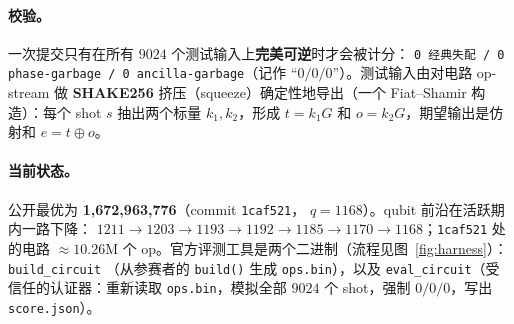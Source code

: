 \documentclass[11pt]{ctexart}
\let\c\lstinline
\begin{document}
\paragraph{校验。}一次提交只有在所有 $9024$ 个测试输入上\textbf{完美可逆}时才会被计分：
\texttt{0 经典失配 / 0 phase-garbage / 0 ancilla-garbage}（记作 ``$0/0/0$''）。测试输入由对电路
op-stream 做 \textbf{SHAKE256} 挤压（squeeze）确定性地导出（一个 Fiat--Shamir 构造）：每个 shot
$s$ 抽出两个标量 $k_1,k_2$，形成 $t=k_1 G$ 和 $o=k_2 G$，期望输出是仿射和 $e = t \oplus o$。

\paragraph{当前状态。}公开最优为 \textbf{1{,}672{,}963{,}776}（commit \texttt{1caf521}，
$q=1168$）。qubit 前沿在活跃期内一路下降：
$1211 \to 1203 \to 1193 \to 1192 \to 1185 \to 1170 \to 1168$；\texttt{1caf521} 处的电路
$\approx 10.26$M 个 op。官方评测工具是两个二进制（流程见图~\ref{fig:harness}）：\c{build_circuit}
（从参赛者的 \c{build()} 生成 \texttt{ops.bin}），以及 \c{eval_circuit}（受信任的认证器：重新读取
\texttt{ops.bin}，模拟全部 $9024$ 个 shot，强制 $0/0/0$，写出 \texttt{score.json}）。
\end{document}
